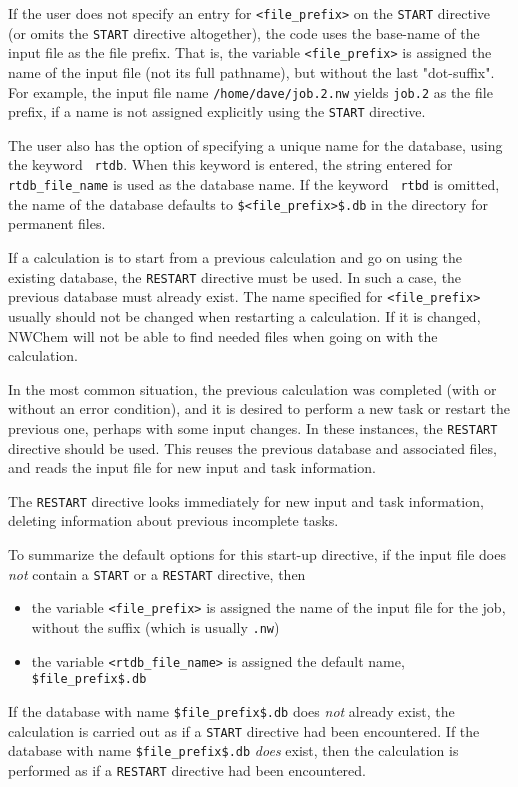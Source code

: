 If the user does not specify an entry for {\tt <file\_prefix>} on the
\verb+START+ directive (or omits the \verb+START+ directive
altogether), the code uses the base-name of the input file as the file
prefix.  That is, the variable {\tt <file\_prefix>} is assigned the
name of the input file (not its full pathname), but without the last
"dot-suffix".  For example, the input file name
\verb+/home/dave/job.2.nw+ yields \verb+job.2+ as the file prefix, if
a name is not assigned explicitly using the \verb+START+ directive.

The user also has the option of
specifying a unique name for the database, using the keyword {\tt
  rtdb}.  When this keyword is entered, the string entered for {\tt
  rtdb\_file\_name} is used as the database name.  If the keyword {\tt
  rtbd} is omitted, the name of the database defaults to
\verb+$<file_prefix>$.db+ in the directory for permanent files.

If a calculation is to start from a previous calculation and go on
using the existing database, the \verb+RESTART+ directive 
must be used.  In such a case, the previous
database must already exist.  The name specified for {\tt <file\_prefix>} 
usually should
not be changed when restarting a calculation.  If it is changed, NWChem 
will not
be able to find needed files when going on with the
calculation.

In the most common
situation, the previous calculation was completed (with or without an error
condition), and it is desired to perform a new task or restart the
previous one, perhaps with some input changes.  In these instances,
the \verb+RESTART+ directive should be used.  This reuses the previous
database and associated files, and reads the input file for new input
and task information.

The \verb+RESTART+ directive looks immediately for new input and task
information, deleting information about previous incomplete tasks.

To summarize the default options for this start-up directive, if the 
input file does {\em not} contain a \verb+START+ or a
\verb+RESTART+ directive, then
\begin{itemize}
  \item the variable {\tt <file\_prefix>} is assigned the name of the 
input file for the job, without the suffix (which is usually \verb+.nw+)
  \item the variable {\tt <rtdb\_file\_name>} is assigned the default name,
\verb+$file_prefix$.db+
\end{itemize}
If the database with name \verb+$file_prefix$.db+ does {\em not} 
already exist,
the calculation is carried out as if a \verb+START+ directive had
been encountered.  If the database with name \verb+$file_prefix$.db+
{\em does} exist, then the calculation is performed as if a
\verb+RESTART+ directive had been encountered.  

